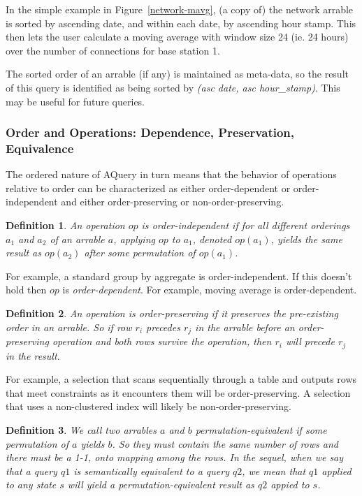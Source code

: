 \documentclass{acm_proc_article-sp}
\newtheorem{definition}{Definition}
\begin{document}
In the simple example in Figure~\ref{network-mavg}, (a copy of) the network arrable is sorted by ascending date, and within each date, by ascending hour stamp. This then lets the user calculate a moving average with window size 24 (ie. 24 hours) over the number of connections for base station 1.

The sorted order of an arrable (if any) is maintained as meta-data, so the result of this query is identified as being sorted by \textit{(asc date, asc hour\_stamp)}. This may be useful for future queries.

\subsubsection{Order and Operations: Dependence, Preservation, Equivalence}
The ordered nature of AQuery in turn means that the behavior of operations relative to order can be characterized as either order-dependent or order-independent and either order-preserving or non-order-preserving.
 
 \begin{definition}
An operation $op$ is {\em order-independent} if for all different
orderings $a_1$ and $a_2$ of an arrable $a$, 
applying $op$ to $a_1$, denoted $op(a_1 )$, yields the same
result as $op(a_2 )$ after some permutation of $op(a_1 )$. 
\end{definition}

For example, a standard group by aggregate is order-independent.
If this doesn't hold then $op$ is {\em order-dependent}. 
For example, moving average is order-dependent.

 \begin{definition} 
An operation is {\em order-preserving} if 
it preserves the pre-existing order in an arrable. 
So if row $r_i$ precedes $r_j$ in the arrable before an order-preserving
operation and both rows survive the operation, then $r_i$ will precede
$r_j$ in the result.
\end{definition}

For example, a selection that scans sequentially through a table 
and outputs rows
that meet constraints as it encounters them will be order-preserving.
A selection that uses a non-clustered index will likely be non-order-preserving.

\begin{definition}
We call two arrables $a$ and $b$ {\em permutation-equivalent} if  
some permutation of $a$ yields $b$. So they must contain the same number
of rows and there must be a 1-1, onto mapping among the rows.
In the sequel, when we say that a query $q1$ is semantically equivalent
to a query $q2$, we mean that $q1$ applied to any state $s$ will yield
a permutation-equivalent result as $q2$ appied to $s$.
\end{definition}
\end{document}
